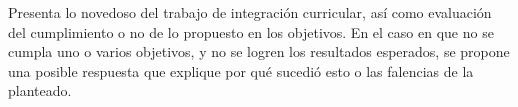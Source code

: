 Presenta lo novedoso del trabajo de integración curricular, así como evaluación del cumplimiento o no de lo propuesto en los objetivos. En el caso en que no se cumpla uno o varios objetivos, y no se logren los resultados esperados, se propone una posible respuesta que explique por qué sucedió esto o las falencias de la planteado. 